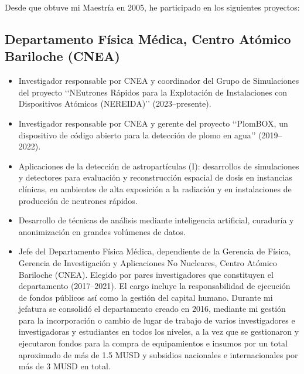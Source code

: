 Desde que obtuve mi Maestría en 2005, he participado en los siguientes proyectos:

\subsection*{Departamento Física Médica, Centro Atómico Bariloche (CNEA)}
\begin{itemize}
	\item Investigador responsable por CNEA y coordinador del Grupo de Simulaciones del proyecto \lq\lq{}NEutrones Rápidos para la Explotación de Instalaciones con Dispositivos Atómicos (NEREIDA)\rq\rq{} (2023--presente).
	\item Investigador responsable por CNEA y gerente del proyecto \lq\lq{}PlomBOX, un dispositivo de código abierto para la detección de plomo en agua\rq\rq{} (2019--2022).
	\item Aplicaciones de la detección de astropartículas (I): desarrollos de simulaciones y detectores para evaluación y reconstrucción espacial de dosis en instancias clínicas, en ambientes de alta exposición a la radiación y en instalaciones de producción de neutrones rápidos.
	\item Desarrollo de técnicas de análisis mediante inteligencia artificial, curaduría y anonimización en grandes volúmenes de datos.
	\item Jefe del Departamento Física Médica, dependiente de la Gerencia de Física, Gerencia de Investigación y Aplicaciones No Nucleares, Centro Atómico Bariloche (CNEA).
 	Elegido por pares investigadores que constituyen el departamento (2017--2021).
 	El cargo incluye la responsabilidad de ejecución de fondos públicos así como la gestión del capital humano.
 	Durante mi jefatura se consolidó el departamento creado en 2016, mediante mi gestión para la incorporación o cambio de lugar de trabajo de varios investigadores e investigadoras y estudiantes en todos los niveles, a la vez que se gestionaron y ejecutaron fondos para la compra de equipamientos e insumos por un total aproximado de más de 1.5 MUSD y subsidios nacionales e internacionales por más de 3 MUSD en total.
\end{itemize}

